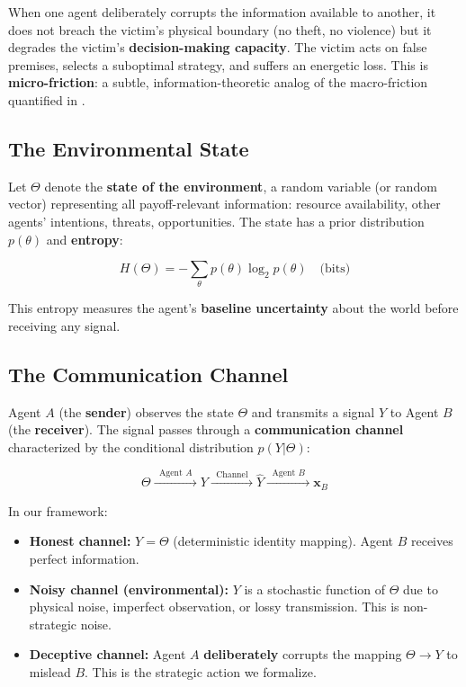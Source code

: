 \documentclass[11pt]{article}
\theoremstyle{plain}
\theoremstyle{definition}
\theoremstyle{remark}
\let\origsubsection\subsection
\renewcommand{\subsection}{\needspace{7\baselineskip}\origsubsection}
\providecommand{\tightlist}{%
  \setlength{\itemsep}{0pt}\setlength{\parskip}{0pt}}
\begin{document}
When one agent deliberately corrupts the information available to
another, it does not breach the victim's physical boundary (no theft, no
violence) but it degrades the victim's \textbf{decision-making
capacity}. The victim acts on false premises, selects a suboptimal
strategy, and suffers an energetic loss. This is
\textbf{micro-friction}: a subtle, information-theoretic analog of the
macro-friction quantified in \citep{TC-IV}.

\subsection{The Environmental State}\label{the-environmental-state}

Let \(\Theta\) denote the \textbf{state of the environment}, a random
variable (or random vector) representing all payoff-relevant
information: resource availability, other agents' intentions, threats,
opportunities. The state has a prior distribution \(p(\theta)\) and
\textbf{entropy}:

\[H(\Theta) = -\sum_{\theta} p(\theta) \log_2 p(\theta) \quad \text{(bits)}\]

This entropy measures the agent's \textbf{baseline uncertainty} about
the world before receiving any signal.

\subsection{The Communication Channel}\label{the-communication-channel}

Agent \(A\) (the \textbf{sender}) observes the state \(\Theta\) and
transmits a signal \(Y\) to Agent \(B\) (the \textbf{receiver}). The
signal passes through a \textbf{communication channel} characterized by
the conditional distribution \(p(Y | \Theta)\):

\[\Theta \xrightarrow{\;\;\text{Agent } A\;\;} Y \xrightarrow{\;\;\text{Channel}\;\;} \hat{Y} \xrightarrow{\;\;\text{Agent } B\;\;} \mathbf{x}_B\]

In our framework:

\begin{itemize}
\tightlist
\item
  \textbf{Honest channel:} \(Y = \Theta\) (deterministic identity
  mapping). Agent \(B\) receives perfect information.
\item
  \textbf{Noisy channel (environmental):} \(Y\) is a stochastic function
  of \(\Theta\) due to physical noise, imperfect observation, or lossy
  transmission. This is non-strategic noise.
\item
  \textbf{Deceptive channel:} Agent \(A\) \textbf{deliberately} corrupts
  the mapping \(\Theta \to Y\) to mislead \(B\). This is the strategic
  action we formalize.
\end{itemize}
\end{document}
